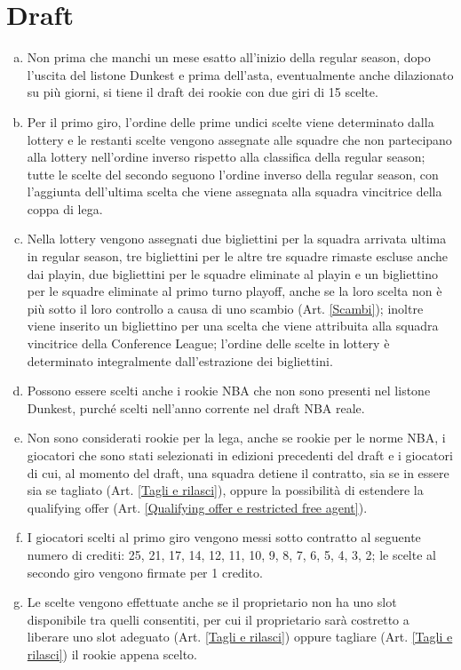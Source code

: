 \documentclass{article}
\begin{document}
\section{Draft}\label{Draft}
\begin{enumerate}[(a)]
\item Non prima che manchi un mese esatto all'inizio della regular season, dopo l'uscita del listone Dunkest e prima dell'asta, eventualmente anche dilazionato su più giorni, si tiene il draft dei rookie con due giri di 15 scelte.
\item Per il primo giro, l'ordine delle prime undici scelte viene determinato dalla lottery e le restanti scelte vengono assegnate alle squadre che non partecipano alla lottery nell'ordine inverso rispetto alla classifica della regular season; tutte le scelte del secondo seguono l'ordine inverso della regular season, con l'aggiunta dell'ultima scelta che viene assegnata alla squadra vincitrice della coppa di lega.
\item Nella lottery vengono assegnati due bigliettini per la squadra arrivata ultima in regular season, tre bigliettini per le altre tre squadre rimaste escluse anche dai playin, due bigliettini per le squadre eliminate al playin e un bigliettino per le squadre eliminate al primo turno playoff, anche se la loro scelta non è più sotto il loro controllo a causa di uno scambio (Art. \ref{Scambi}); inoltre viene inserito un bigliettino per una scelta che viene attribuita alla squadra vincitrice della Conference League; l'ordine delle scelte in lottery è determinato integralmente dall'estrazione dei bigliettini.
\item Possono essere scelti anche i rookie NBA che non sono presenti nel listone Dunkest, purché scelti nell'anno corrente nel draft NBA reale.
\item Non sono considerati rookie per la lega, anche se rookie per le norme NBA, i giocatori che sono stati selezionati in edizioni precedenti del draft e i giocatori di cui, al momento del draft, una squadra detiene il contratto, sia se in essere sia se tagliato (Art. \ref{Tagli e rilasci}), oppure la possibilità di estendere la qualifying offer (Art. \ref{Qualifying offer e restricted free agent}).
\item I giocatori scelti al primo giro vengono messi sotto contratto al seguente numero di crediti: 25, 21, 17, 14, 12, 11, 10, 9, 8, 7, 6, 5, 4, 3, 2; le scelte al secondo giro vengono firmate per 1 credito.
\item Le scelte vengono effettuate anche se il proprietario non ha uno slot disponibile tra quelli consentiti, per cui il proprietario sarà costretto a liberare uno slot adeguato (Art. \ref{Tagli e rilasci}) oppure tagliare (Art. \ref{Tagli e rilasci}) il rookie appena scelto.
\end{enumerate}
\end{document}

